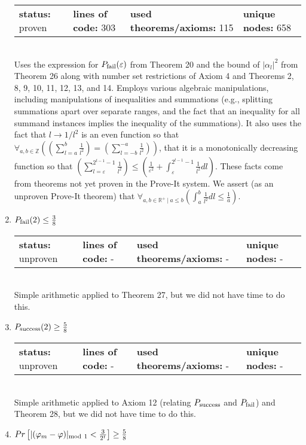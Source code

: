 \documentclass{article}[12pt]
\begin{document}
\begin{enumerate}
\begin{tabular}{l | l | l | l}
    \textbf{status:} proven & \textbf{lines of code:} 303 & \textbf{used theorems/axioms:} 115 & \textbf{unique nodes:} 658
  \end{tabular} \hfill \\
  Uses the expression for $P_{\rm fail}(\varepsilon)$ from Theorem 20 and the bound of $\lvert \alpha_l \rvert^2$ from Theorem 26 along with number set restrictions of Axiom 4 and Theorems 2, 8, 9, 10, 11, 12, 13, and 14.  Employs various algebraic manipulations, including manipulations of inequalities and summations (e.g., splitting summations apart over separate ranges, and the fact that an inequality for all summand instances implies the inequality of the summations).  It also uses the fact that $l \rightarrow 1/l^2$ is an even function so that $\forall_{a, b \in \mathbb{Z}} \left(\left(\sum_{l=a}^{b} \frac{1}{l^{2}}\right) = \left(\sum_{l=-b}^{-a} \frac{1}{l^{2}}\right)\right)$, that it is a monotonically decreasing function so that $\left(\sum_{l=\varepsilon}^{2^{t - 1} - 1} \frac{1}{l^{2}}\right) \leq \left(\frac{1}{\varepsilon^{2}} + \int_{\varepsilon}^{2^{t - 1} - 1}\frac{1}{l^{2}}dl\right)$.  These facts come from theorems not yet proven in the Prove-It system.  We assert (as an unproven Prove-It theorem) that $\forall_{a, b \in \mathbb{R}^+~|~a \leq b} \left(\int_{a}^{b}\frac{1}{l^{2}}dl \leq \frac{1}{a}\right)$.
\item $P_{\rm fail}(2) \leq \frac{3}{8}$ \hfill \\
  \begin{tabular}{l | l | l | l}
    \textbf{status:} unproven & \textbf{lines of code:} - & \textbf{used theorems/axioms:} - & \textbf{unique nodes:} -            
  \end{tabular} \hfill \\
Simple arithmetic applied to Theorem 27, but we did not have time to do this.
\item $P_{\rm success}(2) \geq \frac{5}{8}$ \hfill \\
  \begin{tabular}{l | l | l | l}
    \textbf{status:} unproven & \textbf{lines of code:} - & \textbf{used theorems/axioms:} - & \textbf{unique nodes:} -            
  \end{tabular} \hfill \\
  Simple arithmetic applied to Axiom 12 (relating $P_{\rm success}$ and $P_{\rm fail}$) and Theorem 28, but we did not have time to do this.
\item $Pr\left[\vert (\varphi_m - \varphi) \vert_{{\rm mod}~1} < \frac{3}{2^t}\right] \geq \frac{5}{8}$ \hfill \\

\end{enumerate}
\end{document}
